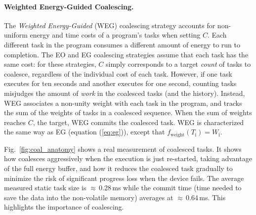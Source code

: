 \paragraph{Weighted Energy-Guided Coalescing.}
\label{subsec:energyTaskAware}

The \emph{Weighted Energy-Guided} (WEG) coalescing strategy accounts for non-uniform energy and time costs of a program's tasks when setting $C$. Each different task in the program consumes a different amount of energy to run to completion. The EO and EG coalescing strategies assume that each task has the same cost: for these strategies, $C$ simply corresponds to a target {\em count} of tasks to coalesce, regardless of the individual cost of each task. However, if one task executes for ten seconds and another executes for one second, counting tasks misjudges the amount of {\em work} in the coalesced tasks (and the history).
%
Instead, WEG associates a non-unity weight with each task in the program, and tracks the sum of the weights of tasks in a coalesced sequence. When the sum of weights reaches $C$, the target, WEG commits the coalesced task.
WEG is characterized the same way as EG (equation (\ref{eq:eg})), except that $f_\text{weight}(T_\text{i}) = W_\text{i}$.
%

Fig.~\ref{fig:coal_anatomy} shows a real measurement of \sys coalesced tasks. It shows how \sys coalesces aggressively when the execution is just re-started, taking advantage of the full energy buffer, and how it reduces the coalesced task gradually to minimize the risk of significant progress loss when the device fails. The average measured static task size is $\approx$\,0.28\,ms while the commit time (time needed to save the data into the non-volatile memory) averages at  $\approx$\,0.64\,ms. This highlights the importance of coalescing.